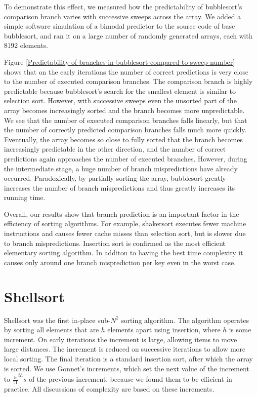 \documentclass[acmtocl]{acmtrans2m}
\begin{document}
To demonstrate this effect, we measured how the predictability of
bubblesort's comparison branch varies with successive sweeps across
the array. We added a simple software simulation of a bimodal
predictor to the source code of base bubblesort, and ran it on a large
number of randomly generated arrays, each with 8192 elements.

Figure
\ref{Predictability-of-branches-in-bubblesort-compared-to-sweep-number}
shows that on the early iterations the number of correct predictions
is very close to the number of executed comparison branches. The
comparison branch is highly predictable because bubblesort's search
for the smallest element is similar to selection sort. However, with
successive sweeps even the unsorted part of the array becomes
increasingly sorted and the branch becomes more unpredictable. We see
that the number of executed comparison branches falls linearly, but
that the number of correctly predicted comparison branches falls much
more quickly. Eventually, the array becomes so close to fully sorted
that the branch becomes increasingly predictable in the other
direction, and the number of correct predictions again approaches the
number of executed branches. However, during the intermediate stage,
a huge number of branch mispredictions have already
occurred. Paradoxically, by partially sorting the array, bubblesort
greatly increases the number of branch mispredictions and thus greatly
increases its running time.

Overall, our results show that branch prediction is an important
factor in the efficiency of sorting algorithms. For example,
shakersort executes fewer machine instructions and causes fewer cache
misses than selection sort, but is slower due to branch
mispredictions. Insertion sort is confirmed as the most efficient
elementary sorting algorithm. In additon to having the best time
complexity it causes only around one branch misprediction per key even
in the worst case.

\section{Shellsort}
Shellsort \cite{Shell59} was the first in-place sub-$N^2$ sorting
algorithm. The algorithm operates by sorting all elements that are $h$
elements apart using insertion, where $h$ is some increment.  On early
iterations the increment is large, allowing items to move large
distances. The increment is reduced on successive iterations to allow
more local sorting. The final iteration is a standard insertion sort,
after which the array is sorted. We use Gonnet's increments, which set
the next value of the increment to $\frac{5}{11}^{th}s$ of the
previous increment, because we found them to be efficient in practice.
All discussions of complexity are based on these increments.
\end{document}
